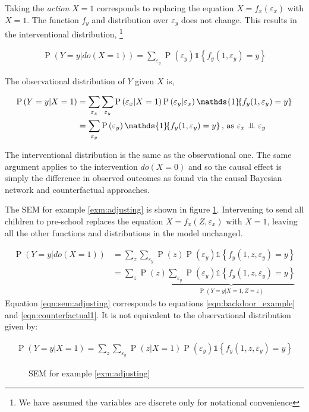 \documentclass[11pt,a4paper,oneside]{book}
\newcommand{\set}[1]{\left\{#1\right\}}
\newcommand{\ind}[1]{\mathds{1}\!\!\set{#1}}
\newcommand{\eqn}[1]{\begin{align}#1\end{align}}
\renewcommand{\P}[1]{\operatorname{P}\left(#1\right)}
\theoremstyle{plain}
\theoremstyle{definition}
\let\epsilon\varepsilon
\newcommand{\ci}{\mathrel{\perp\mspace{-10mu}\perp}}
\begin{document}
Taking the \emph{action} $X=1$ corresponds to replacing the equation $X=f_x(\epsilon_x)$ with $X=1$. The function $f_y$ and distribution over $\epsilon_y$ does not change. This results in the interventional distribution, \footnote{We have assumed the variables are discrete only for notational convenience}

\eqn {
\P{Y=y|do(X=1)} = \sum_{\epsilon_y}\P{\epsilon_y}\ind{f_y(1,\epsilon_y)=y}
}

The observational distribution of $Y$ given $X$ is,

\eqn{
\P{Y=y|X=1} &= \sum_{\epsilon_x}\sum_{\epsilon_y}\P{\epsilon_x|X=1}\P{\epsilon_y|\epsilon_x}\ind{f_y(1,\epsilon_y)=y} \\
& = \sum_{\epsilon_y}\P{\epsilon_y}\ind{f_y(1,\epsilon_y)=y} \text{, as } \epsilon_x \ci \epsilon_y
}

The interventional distribution is the same as the observational one. The same argument applies to the intervention $do(X=0)$ and so the causal effect is simply the difference in observed outcomes as found via the causal Bayesian network and counterfactual approaches. 

The SEM for example \ref{exm:adjusting} is shown in figure \ref{fig:sem:preschool}. Intervening to send all children to pre-school replaces the equation $X = f_x(Z,\epsilon_x)$ with $X=1$, leaving all the other functions and distributions in the model unchanged. 

\eqn{
\P{Y=y|do(X=1)} &= \sum_{z}\sum_{\epsilon_y}\P{z}\P{\epsilon_y}\ind{f_y(1,z,\epsilon_y)=y} \\
\label{eqn:sem:adjusting}
&=\sum_{z}\P{z}\underbrace{\sum_{\epsilon_y}\P{\epsilon_y}\ind{f_y(1,z,\epsilon_y)=y}}_{\P{Y=y|X=1,Z=z}}
}
Equation \ref{eqn:sem:adjusting} corresponds to equations \ref{eqn:backdoor_example} and \ref{eqn:counterfactual1}. It is not equivalent to the observational distribution given by:

\eqn{
\P{Y=y|X=1} = \sum_{z}\sum_{\epsilon_y}\P{z|X=1}\P{\epsilon_y}\ind{f_y(1,z,\epsilon_y)=y}
}


\begin{figure}[h]
\centering
{}
\caption{SEM for example \ref{exm:adjusting}}
\label{fig:sem:preschool}
\end{figure}
\end{document}
